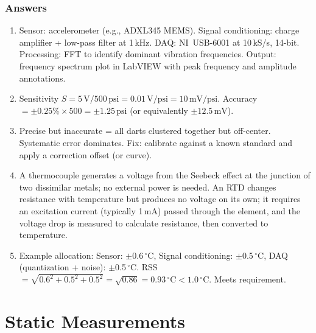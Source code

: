 \documentclass[11pt,letterpaper,twoside,openany]{book}
\newcommand{\degC}{\ensuremath{{}^{\circ}\text{C}}}
\begin{document}
\subsection{Answers}
\begin{enumerate}[leftmargin=1.5em]
\item Sensor: accelerometer (e.g., ADXL345 MEMS). Signal conditioning: charge amplifier + low-pass filter at 1\,kHz. DAQ: NI~USB-6001 at 10\,kS/s, 14-bit. Processing: FFT to identify dominant vibration frequencies. Output: frequency spectrum plot in LabVIEW with peak frequency and amplitude annotations.
\item Sensitivity $S = 5\,\text{V} / 500\,\text{psi} = 0.01\,\text{V/psi} = 10\,\text{mV/psi}$. Accuracy $= \pm 0.25\% \times 500 = \pm 1.25\,\text{psi}$ (or equivalently $\pm 12.5\,\text{mV}$).
\item Precise but inaccurate = all darts clustered together but off-center. Systematic error dominates. Fix: calibrate against a known standard and apply a correction offset (or curve).
\item A thermocouple generates a voltage from the Seebeck effect at the junction of two dissimilar metals; no external power is needed. An RTD changes resistance with temperature but produces no voltage on its own; it requires an excitation current (typically 1\,mA) passed through the element, and the voltage drop is measured to calculate resistance, then converted to temperature.
\item Example allocation: Sensor: $\pm$0.6\,\degC{}, Signal conditioning: $\pm$0.5\,\degC{}, DAQ (quantization + noise): $\pm$0.5\,\degC{}. RSS $= \sqrt{0.6^2 + 0.5^2 + 0.5^2} = \sqrt{0.86} = 0.93\,\degC{} < 1.0\,\degC{}$. Meets requirement.
\end{enumerate}


\chapter{Static Measurements}
\label{ch:static}
\end{document}

